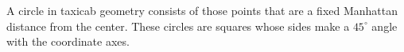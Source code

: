 A circle in taxicab geometry consists of those points that are a fixed Manhattan distance from the center. These circles are squares whose sides make a $45^\circ$ angle with the coordinate axes.

% 
% 
% 
% 
% 

